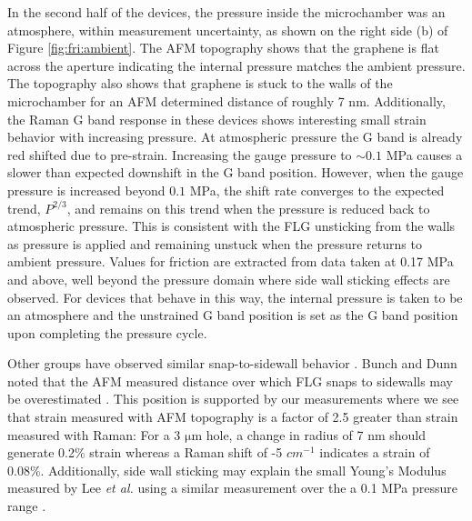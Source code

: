 In the second half of the devices, the pressure inside the microchamber was an atmosphere, within measurement uncertainty, as shown on the right side (b) of Figure \ref{fig:fri:ambient}.
The AFM topography shows that the graphene is flat across the aperture indicating the internal pressure matches the ambient pressure.
The topography also shows that graphene is stuck to the walls of the microchamber for an AFM determined distance of roughly 7 nm.
Additionally, the Raman G band response in these devices shows interesting small strain behavior with increasing pressure.
At atmospheric pressure the G band is already red shifted due to pre-strain.
Increasing the gauge pressure to $\sim 0.1$ MPa causes a slower than expected downshift in the G band position.
However, when the gauge pressure is increased beyond $0.1$ MPa, the shift rate converges to the expected trend, $P^{2/3}$, and remains on this trend when the pressure is reduced back to atmospheric pressure.
This is consistent with the FLG unsticking from the walls as pressure is applied and remaining unstuck when the pressure returns to ambient pressure.
Values for friction are extracted from data taken at 0.17 MPa and above, well beyond the pressure domain where side wall sticking effects are observed.
For devices that behave in this way, the internal pressure is taken to be an atmosphere and the unstrained G band position is set as the G band position upon completing the pressure cycle.

Other groups have observed similar snap-to-sidewall behavior \cite{Lee2008,Bunch2008}.
Bunch and Dunn noted that the AFM measured distance over which FLG snaps to sidewalls may be overestimated \cite{Bunch2012}.
This position is supported by our measurements where we see that strain measured with AFM topography is a factor of 2.5 greater than strain measured with Raman: For a 3 $\mathrm{\mu}$m hole, a change in radius of 7 nm should generate 0.2\% strain whereas a Raman shift of -5 $cm^{-1}$ indicates a strain of 0.08\%.
Additionally, side wall sticking may explain the small Young's Modulus measured by Lee \textit{et al.} using a similar measurement over the a 0.1 MPa pressure range \cite{Lee2012}.

